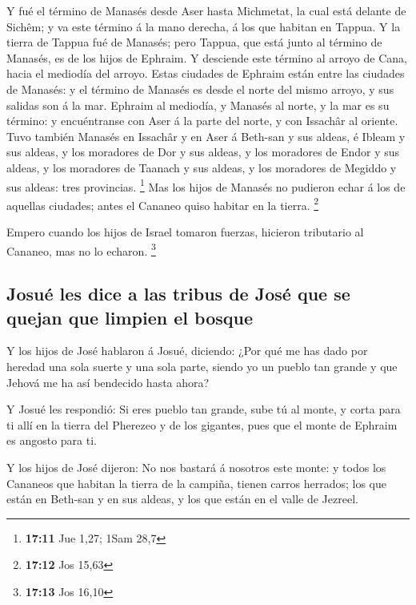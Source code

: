  Y fué el término de Manasés desde Aser hasta Michmetat, la
cual está delante de Sichêm; y va este término á la mano derecha, á los
que habitan en Tappua.  Y la tierra de Tappua fué de
Manasés; pero Tappua, que está junto al término de Manasés, es de los
hijos de Ephraim.  Y desciende este término al arroyo de
Cana, hacia el mediodía del arroyo. Estas ciudades de Ephraim están
entre las ciudades de Manasés: y el término de Manasés es desde el norte
del mismo arroyo, y sus salidas son á la mar.  Ephraim al
mediodía, y Manasés al norte, y la mar es su término: y encuéntranse con
Aser á la parte del norte, y con Issachâr al oriente.  Tuvo
también Manasés en Issachâr y en Aser á Beth-san y sus aldeas, é Ibleam
y sus aldeas, y los moradores de Dor y sus aldeas, y los moradores de
Endor y sus aldeas, y los moradores de Taanach y sus aldeas, y los
moradores de Megiddo y sus aldeas: tres provincias. \footnote{\textbf{17:11}
  Jue 1,27; 1Sam 28,7}  Mas los hijos de Manasés no
pudieron echar á los de aquellas ciudades; antes el Cananeo quiso
habitar en la tierra. \footnote{\textbf{17:12} Jos 15,63}

 Empero cuando los hijos de Israel tomaron fuerzas,
hicieron tributario al Cananeo, mas no lo echaron. \footnote{\textbf{17:13}
  Jos 16,10}

\hypertarget{josuuxe9-les-dice-a-las-tribus-de-josuxe9-que-se-quejan-que-limpien-el-bosque}{%
\subsection{Josué les dice a las tribus de José que se quejan que
limpien el
bosque}\label{josuuxe9-les-dice-a-las-tribus-de-josuxe9-que-se-quejan-que-limpien-el-bosque}}

 Y los hijos de José hablaron á Josué, diciendo: ¿Por qué
me has dado por heredad una sola suerte y una sola parte, siendo yo un
pueblo tan grande y que Jehová me ha así bendecido hasta ahora?

 Y Josué les respondió: Si eres pueblo tan grande, sube tú
al monte, y corta para ti allí en la tierra del Pherezeo y de los
gigantes, pues que el monte de Ephraim es angosto para ti.

 Y los hijos de José dijeron: No nos bastará á nosotros
este monte: y todos los Cananeos que habitan la tierra de la campiña,
tienen carros herrados; los que están en Beth-san y en sus aldeas, y los
que están en el valle de Jezreel.

